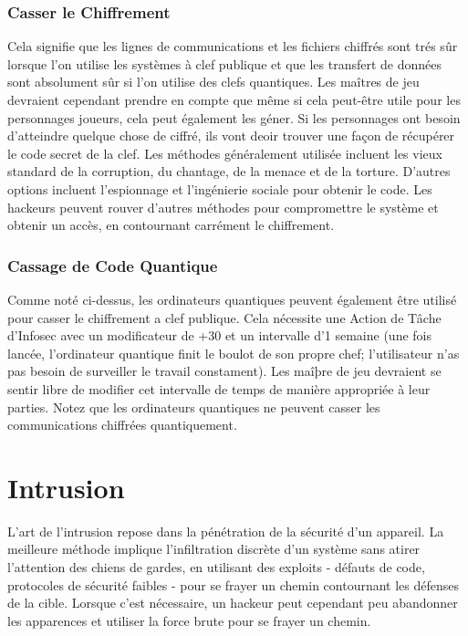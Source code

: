 \subsubsection{Casser le Chiffrement} 

Cela signifie que les lignes de communications et les fichiers chiffrés sont trés sûr lorsque l'on utilise les systèmes à clef publique et que les transfert de données sont absolument sûr si l'on utilise des clefs quantiques. Les maîtres de jeu devraient cependant prendre en compte que même si cela peut-être utile pour les personnages joueurs, cela peut également les géner. Si les personnages ont besoin d'atteindre quelque chose de ciffré, ils vont deoir trouver une façon de récupérer le code secret de la clef. Les méthodes généralement utilisée incluent les vieux standard de la corruption, du chantage, de la menace et de la torture. D'autres options incluent l'espionnage et l'ingénierie sociale pour obtenir le code. Les hackeurs peuvent rouver d'autres méthodes pour compromettre le système et obtenir un accès, en contournant carrément le chiffrement. 

\subsubsection{Cassage de Code Quantique} 

Comme noté ci-dessus, les ordinateurs quantiques peuvent également être utilisé pour casser le chiffrement a clef publique. Cela nécessite une Action de Tâche d'Infosec avec un modificateur de +30 et un intervalle d'1 semaine (une fois lancée, l'ordinateur quantique finit le boulot de son propre chef; l'utilisateur n'as pas besoin de surveiller le travail constament). Les maîþre de jeu devraient se sentir libre de modifier cet intervalle de temps de manière appropriée à leur parties. Notez que les ordinateurs quantiques ne peuvent casser les communications chiffrées quantiquement. 

\section{Intrusion} 

L'art de l'intrusion repose dans la pénétration de la sécurité d'un appareil. La meilleure méthode implique l'infiltration discrète d'un système sans atirer l'attention des chiens de gardes, en utilisant des exploits - défauts de code, protocoles de sécurité faibles - pour se frayer un chemin contournant les défenses de la cible. Lorsque c'est nécessaire, un hackeur peut cependant peu abandonner les apparences et utiliser la force brute pour se frayer un chemin. 

